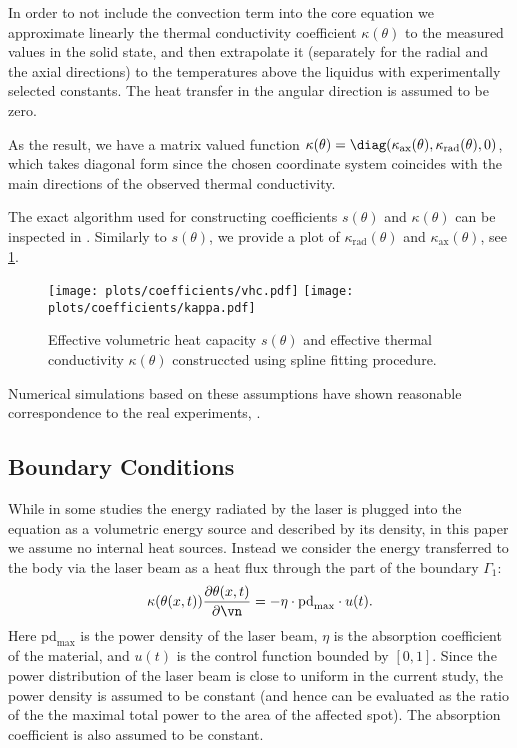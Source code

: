 In order to not include the convection term into the core equation we approximate linearly the thermal conductivity coefficient $\kappa(\theta)$ to the measured values in the solid state, and then extrapolate it (separately for the radial and the axial directions) to the temperatures above the liquidus with experimentally selected constants. The heat transfer in the angular direction is assumed to be zero.

As the result, we have a matrix valued function $\kappa(\theta) = \diag(\kappa_\text{ax}(\theta), \kappa_\text{rad}(\theta), 0)$, which takes diagonal form since the chosen coordinate system coincides with the main directions of the observed thermal conductivity.

The exact algorithm used for constructing coefficients $s(\theta)$ and $\kappa(\theta)$ can be inspected in \cite[\texttt{optipuls.coefficients}]{optipuls_github}. Similarly to $s(\theta)$, we provide a plot of $\kappa_\text{rad}(\theta)$ and $\kappa_\text{ax}(\theta)$, see \cref{fig:coef}.

\begin{figure}[ht]
	\centering
	\texttt{[image: plots/coefficients/vhc.pdf]}
	\texttt{[image: plots/coefficients/kappa.pdf]}
	\caption{Effective volumetric heat capacity $s(\theta)$ and effective thermal conductivity $\kappa(\theta)$ construccted using spline fitting procedure.}
	\label{fig:coef}
\end{figure}

Numerical simulations based on these assumptions have shown reasonable correspondence to the real experiments, .


\subsection{Boundary Conditions}

While in some studies the energy radiated by the laser is plugged into the equation as a volumetric energy source and described by its density, in this paper we assume no internal heat sources.
Instead we consider the energy transferred to the body via the laser beam as a heat flux through the part of the boundary $\Gamma_1$:
\begin{equation}
	\kappa(\theta(x,t)) \frac{\partial \theta(x,t)}{\partial \vn} = - \eta \cdot \text{pd}_{\max} \cdot u(t).
\end{equation}
Here $\text{pd}_{\max}$ is the power density of the laser beam, $\eta$ is the absorption coefficient of the material, and $u(t)$ is the control function bounded by $[0,1]$.
Since the power distribution of the laser beam is close to uniform in the current study, the power density is assumed to be constant (and hence can be evaluated as the ratio of the the maximal total power to the area of the affected spot). The absorption coefficient is also assumed to be constant.

